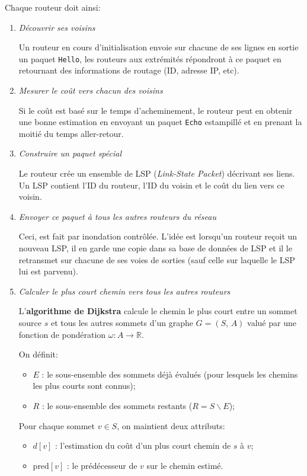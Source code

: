 \documentclass[11pt,english,french]{scrreprt}
\theoremstyle{remark}
\theoremstyle{definition}
\begin{document}
Chaque routeur doit ainsi:\begin{enumerate}
	\item \emph{Découvrir ses voisins}
	
	Un routeur en cours d'initialisation envoie sur chacune de ses lignes en sortie un paquet \lstinline!Hello!, les routeurs aux extrémités répondront à ce paquet en retournant des informations de routage (ID, adresse IP, etc).
	\item \emph{Mesurer le coût vers chacun des voisins}	
	
	Si le coût est basé sur le temps d'acheminement, le routeur peut en obtenir une bonne estimation en envoyant un paquet \lstinline!Echo! estampillé et en prenant la moitié du temps aller-retour.
	\item \emph{Construire un paquet spécial}
	
	Le routeur crée un ensemble de LSP (\emph{Link-State Packet}) décrivant ses liens. Un LSP contient l'ID du routeur, l'ID du voisin et le coût du lien vers ce voisin.
	\item \emph{Envoyer ce paquet à tous les autres routeurs du réseau}
	
	Ceci, est fait par inondation contrôlée. L'idée est lorsqu'un routeur reçoit un nouveau LSP, il en garde une copie dans sa base de données de LSP et il le retransmet sur chacune de ses voies de sorties (sauf celle sur laquelle le LSP lui est parvenu).
	\item \emph{Calculer le plus court chemin vers tous les autres routeurs}
	
	L'\textbf{algorithme de Dijkstra} calcule le chemin le plus court entre un sommet source $s$ et tous les autres sommets d'un graphe $G = (S,\,A)$ valué par une fonction de pondération $\omega \colon A \rightarrow \mathbb{R}$.
	
	On définit:\begin{itemize}
		\item $E$ : le sous-ensemble des sommets déjà évalués (pour lesquels les chemins les plus courts sont connus);
		\item $R$ : le sous-ensemble des sommets restants ($R = S \backslash E$);
	\end{itemize}
	
	Pour chaque sommet $v \in S$, on maintient deux attributs:\begin{itemize}
		\item $d[v]$ : l'estimation du coût d'un plus court chemin de $s$ à $v$;
		\item $\textrm{pred}[v]$ : le prédécesseur de $v$ sur le chemin estimé.
	\end{itemize}
\end{enumerate}
\end{document}
